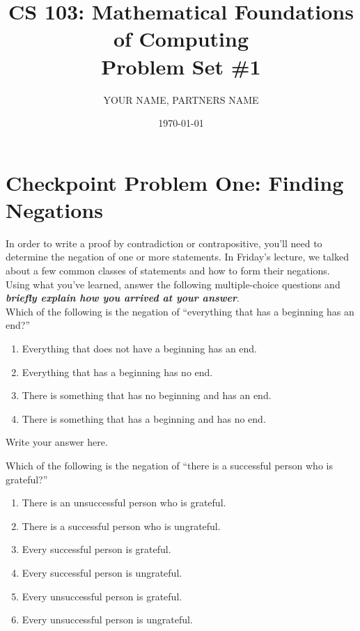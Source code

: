 \documentclass{article}
\title{CS 103: Mathematical Foundations of Computing\\Problem Set \#1}
\author{YOUR NAME, PARTNERS NAME}
\date{\today}
\renewcommand{\(}{\left(}
\renewcommand{\)}{\right)}
\theoremstyle{plain}
\theoremstyle{plain}
\theoremstyle{definition}
\begin{document}
\maketitle

\section*{Checkpoint Problem One: Finding Negations}

In order to write a proof by contradiction or contrapositive, you'll need to determine the negation of one or more statements. In Friday's lecture, we talked about a few common classes of statements and how to form their negations. Using what you've learned, answer the following multiple-choice questions and \textit{\textbf{briefly explain how you arrived at your answer}}. \\

Which of the following is the negation of ``everything that has a beginning has an end?''

\begin{enumerate}[label=\Alph*)]
    \item Everything that does not have a beginning has an end.
    \item Everything that has a beginning has no end.
    \item There is something that has no beginning and has an end.
    \item There is something that has a beginning and has no end.
\end{enumerate}

\begin{shaded}
Write your answer here.
\end{shaded}

Which of the following is the negation of ``there is a successful person who is grateful?''

\begin{enumerate}[label=\Alph*)]
    \item There is an unsuccessful person who is grateful.
    \item There is a successful person who is ungrateful.
    \item Every successful person is grateful.
    \item Every successful person is ungrateful.
    \item Every unsuccessful person is grateful.
    \item Every unsuccessful person is ungrateful.
\end{enumerate}
\end{document}
